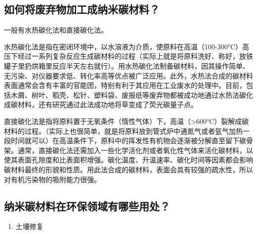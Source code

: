 \documentclass[]{book}
\providecommand{\tightlist}{%
  \setlength{\itemsep}{0pt}\setlength{\parskip}{0pt}}
\begin{document}
\hypertarget{ux5982ux4f55ux5c06ux5e9fux5f03ux7269ux52a0ux5de5ux6210ux7eb3ux7c73ux78b3ux6750ux6599}{%
\subsection{如何将废弃物加工成纳米碳材料？}\label{ux5982ux4f55ux5c06ux5e9fux5f03ux7269ux52a0ux5de5ux6210ux7eb3ux7c73ux78b3ux6750ux6599}}

一般有水热碳化法和直接碳化法。

水热碳化法是指在密闭环境中，以水溶液为介质，使原料在高温（100-300°C）高压下经过一系列复杂反应生成碳材料的过程（实际上就是将原料洗好、称好，放铁罐子里扔烘箱里反应半天左右就行）。用水热碳化法制备碳材料，因其操作简单、无污染、对仪器要求低、转化率高等优点被广泛应用。此外，水热法合成的碳材料表面通常会含有丰富的官能团，特别有利于其应用在工业废水的处理中。目前，包括木屑、树叶、稻壳、松针、塑料袋、废报纸等废弃物都被成功地通过水热法碳化成碳材料，还有研究通过此法成功地将草变成了荧光碳量子点。

直接碳化法是指将原料置于无氧条件（惰性气体）下，高温（\textgreater{}600°C）裂解成碳材料的过程。（实际上也很简单，就是将原料放到管式炉中通氮气或者氩气加热一段时间就可以）在高温条件下，原料中的挥发性有机物会逐渐被分解直至留下碳骨架。通常，直接碳化法还需加入一些化学活化剂或者氧化性气体来活化碳材料，以使其表面孔隙度和比表面积增强。碳化温度、升温速率、碳化时间等因素都会影响碳材料最终的形貌和性质。用此法合成的碳材料，表面会具有较强的疏水性，所以对有机污染物的吸附能力很强。

\hypertarget{ux7eb3ux7c73ux78b3ux6750ux6599ux5728ux73afux4fddux9886ux57dfux6709ux54eaux4e9bux7528ux5904}{%
\subsection{纳米碳材料在环保领域有哪些用处？}\label{ux7eb3ux7c73ux78b3ux6750ux6599ux5728ux73afux4fddux9886ux57dfux6709ux54eaux4e9bux7528ux5904}}

\begin{enumerate}
\def\labelenumi{\arabic{enumi}.}
\tightlist
\item
  土壤修复
\end{enumerate}
\end{document}
